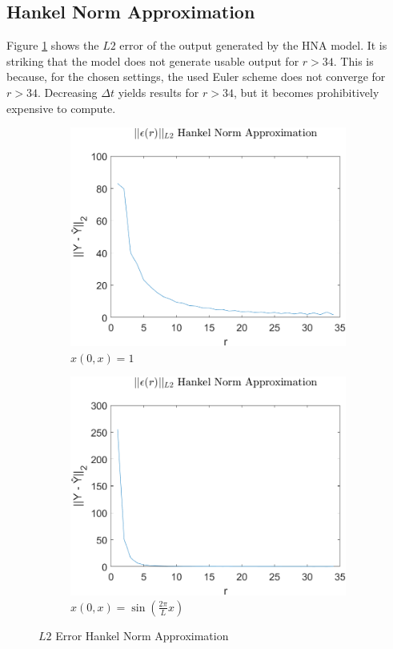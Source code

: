 \subsection{Hankel Norm Approximation}
Figure \ref{FIG-ERR-HNA} shows the \(L2\) error of the output generated by the HNA model.
It is striking that the model does not generate usable output for \(r > 34\).
This is because, for the chosen settings, the used Euler scheme does not converge for \(r > 34\).
Decreasing \(\Delta t\) yields results for \(r > 34\), but it becomes prohibitively expensive to compute.

\begin{figure}[H]
\begin{subfigure}[b]{0.5\textwidth}
\centering
\includegraphics[width=\textwidth]{images/L2_HNA}
\caption{$x(0, x) = 1$}
\label{FIG-ERR-HNA}
\end{subfigure}
\begin{subfigure}[b]{0.5\textwidth}
\centering
\includegraphics[width=\textwidth]{images/L2_HNA_SIN}
\caption{$x(0, x) = \sin(\frac{2\pi}{L}x)$}
\label{FIG-ERR-HNA-SIN}
\end{subfigure}
\caption{\(L2\) Error Hankel Norm Approximation}
\end{figure}
